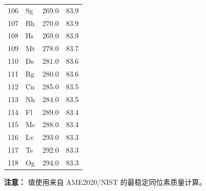 \documentclass[11pt,a4paper]{article}
\begin{document}
\begin{longtable}{c l c c}
		106& Sg  & 269.0  & 83.9 \\
		107& Bh  & 270.0  & 83.9 \\
		108& Hs  & 269.0  & 83.9 \\
		109& Mt  & 278.0  & 83.7 \\
		110& Ds  & 281.0  & 83.6 \\
		111& Rg  & 280.0  & 83.6 \\
		112& Cn  & 285.0  & 83.5 \\
		113& Nh  & 284.0  & 83.5 \\
		114& Fl  & 289.0  & 83.4 \\
		115& Mc  & 288.0  & 83.4 \\
		116& Lv  & 293.0  & 83.3 \\
		117& Ts  & 292.0  & 83.3 \\
		118& Og  & 294.0  & 83.3 \\
		\bottomrule
	\end{longtable}
	\vspace{0.5cm}
	\noindent
	\textbf{注意：} 值使用来自 AME2020/NIST 的最稳定同位素质量计算。
	
\end{document}
